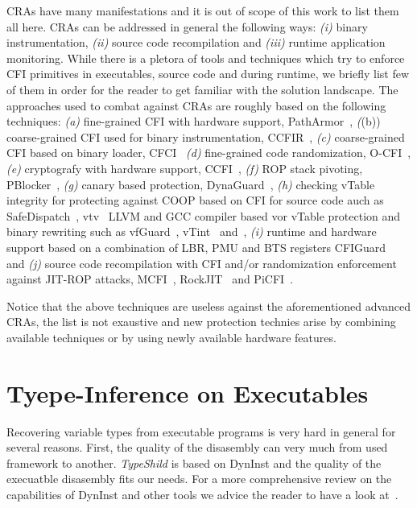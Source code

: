 CRAs have many manifestations and it is out of scope of this work to list them all here.
CRAs can be addressed in general the following ways: 
\textit{(i)} binary instrumentation,
\textit{(ii)} source code recompilation and 
\textit{(iii)} runtime application monitoring.
While there is a pletora of tools and techniques which try to enforce CFI 
primitives in executables, source code and during runtime, we briefly list
few of them in order for the reader to get familiar with the solution landscape.
The approaches used to combat against CRAs are roughly based on the following techniques:
\textit{(a)} fine-grained CFI with hardware support, PathArmor~\cite{veen:cfi},
\textit((b)) coarse-grained CFI used for binary instrumentation, CCFIR~\cite{ccfir:zhang},
\textit{(c)} coarse-grained CFI based on binary loader, CFCI~\cite{cfci:zhang}
\textit{(d)} fine-grained code randomization, O-CFI~\cite{mohan:opaque},
\textit{(e)} cryptografy with hardware support, CCFI~\cite{ccfi:jose},
\textit{(f)} ROP stack pivoting, PBlocker~\cite{pblocker:prakash},
\textit{(g)} canary based protection, DynaGuard~\cite{dynaguard:petsios},
\textit{(h)} checking vTable integrity for protecting against COOP based on CFI for source code auch as SafeDispatch~\cite{safedispatch:jang}, vtv~\cite{vtv:tice} LLVM and GCC compiler based vor vTable protection and binary rewriting such as vfGuard~\cite{vfuard:aravind}, vTint~\cite{vtint:zhang} and~\cite{trap:crane},
\textit{(i)} runtime and hardware support based on a combination of LBR, PMU and BTS registers CFIGuard~\cite{cfiguard:yuan} and
\textit{(j)} source code recompilation with CFI and/or randomization enforcement against JIT-ROP attacks, MCFI~\cite{mcfi:niu}, RockJIT~\cite{rockjit:niu} and PiCFI~\cite{perinput:niu}.

Notice that the above techniques are useless against the aforementioned advanced CRAs,
the list is not exaustive and new protection technies arise by combining available techniques
or by using newly available hardware features.

\section{Tyepe-Inference on Executables}
\label{Tyepe-Inference on Executables}
Recovering variable types from executable programs
is very hard in general for several reasons. 
First, the quality of the disasembly can very much from used
framework to another. \textit{TypeShild} is based on DynInst 
and the quality of the execuatble disasembly fits our needs. 
For a more comprehensive review on the capabilities of DynInst and other tools we
advice the reader to have a look at~\cite{andriesse:indepth}.

